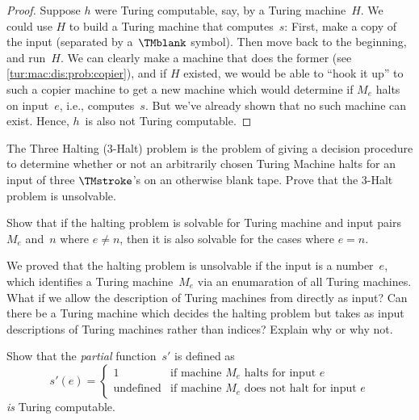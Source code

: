 \documentclass[../../../include/open-logic-section]{subfiles}
\begin{document}
\begin{proof}
Suppose $h$ were Turing computable, say, by a Turing machine~$H$. We
could use $H$ to build a Turing machine that computes~$s$: First, make
a copy of the input (separated by a~$\TMblank$ symbol). Then move back
to the beginning, and run~$H$.  We can clearly make a machine that
does the former (see \cref{tur:mac:dis:prob:copier}), and if $H$
existed, we would be able to ``hook it up'' to such a copier machine
to get a new machine which would determine if $M_e$ halts on
input~$e$, i.e., computes~$s$. But we've already shown that no such
machine can exist. Hence, $h$~is also not Turing computable.
\end{proof}

\begin{prob}
The Three Halting (3-Halt) problem is the problem of giving a decision
procedure to determine whether or not an arbitrarily chosen Turing
Machine halts for an input of three $\TMstroke$'s on an otherwise
blank tape. Prove that the 3-Halt problem is unsolvable.
\end{prob}

\begin{prob}
Show that if the halting problem is solvable for Turing machine and
input pairs $M_e$ and~$n$ where $e \neq n$, then it is also solvable
for the cases where $e = n$.
\end{prob}

\begin{prob}
We proved that the halting problem is unsolvable if the input is a
number~$e$, which identifies a Turing machine~$M_e$ via an enumaration
of all Turing machines.  What if we allow the description of Turing
machines from  directly as input?  Can there
be a Turing machine which decides the halting problem but takes as
input descriptions of Turing machines rather than indices?  Explain
why or why not.
\end{prob}

\begin{prob} Show that the \emph{partial} function~$s'$ is defined as
  \[
  s'(e) =
  \begin{cases}
    \text{1} & \text{if machine~$M_e$ halts for input $e$}\\
    \text{undefined} & \text{if machine~$M_e$ does not halt for input $e$}
  \end{cases}
  \]
  \emph{is} Turing computable.
\end{prob}
\end{document}
